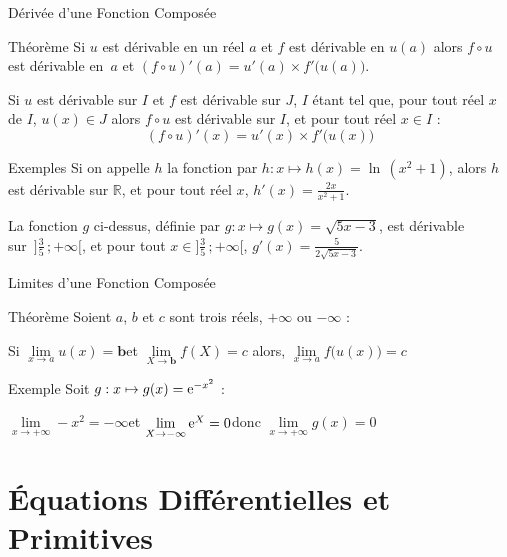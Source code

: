 \documentclass{coursbook}
\begin{document}
    \begin{Gpartie}{Dérivée d'une Fonction Composée} 
        \begin{Spartie}{Théorème} 
            Si $u$ est dérivable en un réel $a$ et $f$ est dérivable en $u(a)$ alors $f\circ u$ est dérivable en~$a$ et $(f\circ u)'(a)=u'(a)\times f'\big(u(a)\big)$.

            Si $u$ est dérivable sur $I$ et $f$ est dérivable sur $J$, $I$ étant tel que, pour tout réel $x$ de $I$, $u(x)\in J$ alors $f\circ u$ est dérivable sur $I$, et pour tout réel $x\in I$ : \[\boxed{(f\circ u)'(x)=u'(x)\times f'\big(u(x)\big)}\] 
        \end{Spartie}
        \begin{Spartie}{Exemples} 
            Si on appelle $h$ la fonction par $h:x\mapsto h(x)=\ln\,(x^2+1)$, alors $h$ est dérivable sur $\mathbb{R}$, et pour tout réel $x$, $h'(x)=\frac{2x}{x^2+1}$.

            La fonction $g$ ci-dessus, définie par $g:x\mapsto g(x)=\sqrt{5x-3}$, est dérivable \\ sur~$\Big]\frac{3}{5}\,;+\infty\Big[$, et pour tout $x\in\Big]\frac{3}{5}\,;+\infty\Big[$, $g'(x)=\frac{5}{2\sqrt{5x-3}}$.
        \end{Spartie}
    \end{Gpartie}
    \begin{Gpartie}{Limites d'une Fonction Composée} 
        \begin{Spartie}{Théorème} 
            Soient $a$, $b$ et $c$ sont trois réels, $+\infty$ ou $-\infty$ :

            Si \qquad$\lim\limits_{x\to a}u(x)=\boxed{\boldsymbol{b}}$\qquad et \qquad $\lim\limits_{X\to \boxed{\boldsymbol{b}}}f(X)=c$ \qquad alors, \qquad $\boxed{\lim\limits_{x\to a}f\big(u(x)\big)=c}$
        \end{Spartie}
        \begin{Spartie}{Exemple} 
            Soit $g:x\mapsto g(x)=\mathrm{e}^{-x^2}$ :

            $\lim\limits_{x\to +\infty} -x^2=-\infty$\qquad et \qquad$\lim\limits_{X\to -\infty} \mathrm{e}^X=0$\qquad donc \qquad$\lim\limits_{x\to +\infty}g(x)=0$
        \end{Spartie}
    \end{Gpartie}



    \chapter{Équations Différentielles et Primitives}
\end{document}
